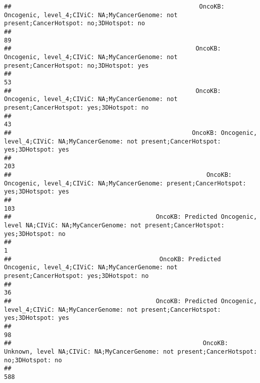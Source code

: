 \documentclass[
]{article}
\begin{document}
\begin{verbatim}
##                                                    OncoKB: Oncogenic, level_4;CIViC: NA;MyCancerGenome: not present;CancerHotspot: no;3DHotspot: no 
##                                                                                                                                                  89 
##                                                   OncoKB: Oncogenic, level_4;CIViC: NA;MyCancerGenome: not present;CancerHotspot: no;3DHotspot: yes 
##                                                                                                                                                  53 
##                                                   OncoKB: Oncogenic, level_4;CIViC: NA;MyCancerGenome: not present;CancerHotspot: yes;3DHotspot: no 
##                                                                                                                                                  43 
##                                                  OncoKB: Oncogenic, level_4;CIViC: NA;MyCancerGenome: not present;CancerHotspot: yes;3DHotspot: yes 
##                                                                                                                                                 203 
##                                                      OncoKB: Oncogenic, level_4;CIViC: NA;MyCancerGenome: present;CancerHotspot: yes;3DHotspot: yes 
##                                                                                                                                                 103 
##                                        OncoKB: Predicted Oncogenic, level NA;CIViC: NA;MyCancerGenome: not present;CancerHotspot: yes;3DHotspot: no 
##                                                                                                                                                   1 
##                                         OncoKB: Predicted Oncogenic, level_4;CIViC: NA;MyCancerGenome: not present;CancerHotspot: yes;3DHotspot: no 
##                                                                                                                                                  36 
##                                        OncoKB: Predicted Oncogenic, level_4;CIViC: NA;MyCancerGenome: not present;CancerHotspot: yes;3DHotspot: yes 
##                                                                                                                                                  98 
##                                                     OncoKB: Unknown, level NA;CIViC: NA;MyCancerGenome: not present;CancerHotspot: no;3DHotspot: no 
##                                                                                                                                                 588 

\end{verbatim}
\end{document}

